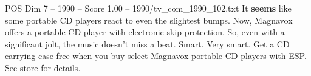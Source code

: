 \begin{textsample}{POS Dim 7 – 1990 – Score 1.00 – 1990/tv\_com\_1990\_102.txt}  \label{ex:f7_pos_066}
It \textbf{seems} like some portable CD players react to even the slightest bumps.
Now, Magnavox offers a portable CD player with electronic skip protection.
So, even with a significant jolt, the music doesn't miss a beat.
Smart.
Very smart.
Get a CD carrying case free when you buy select Magnavox portable CD players with ESP.
See store for details.

\end{textsample}
